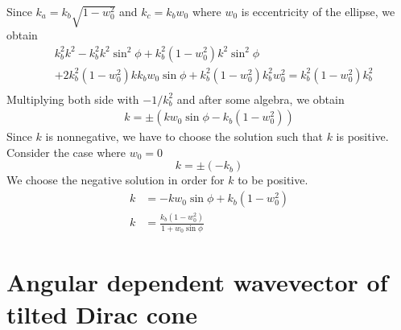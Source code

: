     Since $k_a = k_b \sqrt{1-w_0^2}$ and $k_c = k_b w_0$ where $w_0$ is eccentricity of the ellipse, we obtain
    \begin{equation}
        \begin{aligned}
            &k_b^2 k^2 - k_b^2 k^2 \sin^2{\phi} + k_b^2 (1-w_0^2)k^2 \sin^2{\phi}\\
            &+2 k_b^2 (1-w_0^2) k k_b w_0 \sin{\phi} +k_b^2 (1-w_0^2) k_b^2 w_0^2=k_b^2 (1-w_0^2) k_b^2\\
        \end{aligned}
    \end{equation}
    Multiplying both side with $-1/k_b^2$ and after some algebra, we obtain
    \begin{align} 
        k = \pm (k w_0 \sin{\phi} - k_b(1-w_0^2))
    \end{align}
    Since $k$ is nonnegative, we have to choose the solution such that $k$ is positive.
    Consider the case where $w_0 = 0$
    $$
    k = \pm (-k_b)
    $$
    We choose the negative solution in order for $k$ to be positive.
    \begin{equation}
    \begin{aligned} \label{eq:k vs phi}
        k &= -k w_0 \sin{\phi}+ k_b (1-w_0^2)\\
        k &= \frac{k_b(1-w_0^2)}{1+w_0 \sin{\phi}}
    \end{aligned}
    \end{equation}

\section{Angular dependent wavevector of tilted Dirac cone} \label{sec:k angular dependent k}
     
